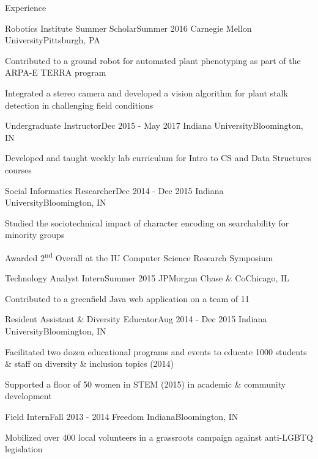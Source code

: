 \documentclass{resume} %
\begin{document}
\begin{rSection}{Experience}

	\begin{rSubsection}{Robotics Institute Summer Scholar}{Summer 2016}
	{Carnegie Mellon University}{Pittsburgh, PA}
	\item Contributed to a ground robot for automated plant phenotyping as part of the ARPA-E TERRA program
	\item Integrated a stereo camera and developed a vision algorithm for plant stalk detection in challenging field conditions
	\end{rSubsection}

	\begin{rSubsection}{Undergraduate Instructor}{Dec 2015 - May 2017}
	{Indiana University}{Bloomington, IN }
	\item Developed and taught weekly lab curriculum for Intro to CS and Data Structures courses 
	\end{rSubsection}

	\begin{rSubsection}{Social Informatics Researcher}{Dec 2014 - Dec 2015}
	{Indiana University}{Bloomington, IN }
	\item Studied the sociotechnical impact of character encoding on searchability for minority groups
	\item Awarded 2\textsuperscript{nd} Overall at the IU Computer Science Research Symposium
	\end{rSubsection}

	\begin{rSubsection}{Technology Analyst Intern}{Summer 2015}
	{JPMorgan Chase \& Co}{Chicago, IL}
	\item Contributed to a greenfield Java web application on a team of 11
	\end{rSubsection}

	\begin{rSubsection}{Resident Assistant \& Diversity Educator}{Aug 2014 - Dec 2015}
	{Indiana University}{Bloomington, IN }
	\item Facilitated two dozen educational programs and events to educate 1000 students \& staff on diversity \& inclusion topics (2014)
	\item Supported a floor of 50 women in STEM (2015) in academic \& community development 
	\end{rSubsection}

	\begin{rSubsection}{Field Intern}{Fall 2013 - 2014}
	{Freedom Indiana}{Bloomington, IN}
	\item Mobilized over 400 local volunteers in a grassroots campaign against anti-LGBTQ legislation
	\end{rSubsection}

\end{rSection}	
	
\end{document}
